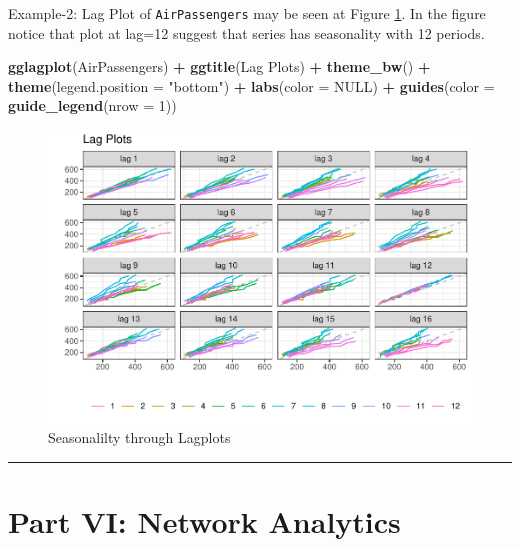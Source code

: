 \documentclass[
]{book}
\newenvironment{Shaded}{\begin{snugshade}}{\end{snugshade}}
\newcommand{\AttributeTok}[1]{\textcolor[rgb]{0.13,0.29,0.53}{#1}}
\newcommand{\ConstantTok}[1]{\textcolor[rgb]{0.56,0.35,0.01}{#1}}
\newcommand{\DecValTok}[1]{\textcolor[rgb]{0.00,0.00,0.81}{#1}}
\newcommand{\FunctionTok}[1]{\textcolor[rgb]{0.13,0.29,0.53}{\textbf{#1}}}
\newcommand{\NormalTok}[1]{#1}
\newcommand{\SpecialCharTok}[1]{\textcolor[rgb]{0.81,0.36,0.00}{\textbf{#1}}}
\newcommand{\StringTok}[1]{\textcolor[rgb]{0.31,0.60,0.02}{#1}}
\begin{document}
Example-2: Lag Plot of \texttt{AirPassengers} may be seen at Figure \ref{fig:lagp}. In the figure notice that plot at lag=12 suggest that series has seasonality with 12 periods.

\begin{Shaded}
\begin{Highlighting}[]
\FunctionTok{gglagplot}\NormalTok{(AirPassengers) }\SpecialCharTok{+}
  \FunctionTok{ggtitle}\NormalTok{(}\StringTok{\textquotesingle{}Lag Plots\textquotesingle{}}\NormalTok{) }\SpecialCharTok{+}
  \FunctionTok{theme\_bw}\NormalTok{() }\SpecialCharTok{+}
  \FunctionTok{theme}\NormalTok{(}\AttributeTok{legend.position =} \StringTok{"bottom"}\NormalTok{) }\SpecialCharTok{+}
  \FunctionTok{labs}\NormalTok{(}\AttributeTok{color =} \ConstantTok{NULL}\NormalTok{) }\SpecialCharTok{+}
  \FunctionTok{guides}\NormalTok{(}\AttributeTok{color =} \FunctionTok{guide\_legend}\NormalTok{(}\AttributeTok{nrow =} \DecValTok{1}\NormalTok{))}
\end{Highlighting}
\end{Shaded}

\begin{figure}

{\centering \includegraphics{DauR_files/figure-latex/lagp-1} 

}

\caption{Seasonalilty through Lagplots}\label{fig:lagp}
\end{figure}

\begin{center}\rule{0.5\linewidth}{0.5pt}\end{center}

\hypertarget{part-vi-network-analytics}{%
\chapter*{Part VI: Network Analytics}\label{part-vi-network-analytics}}
\end{document}
